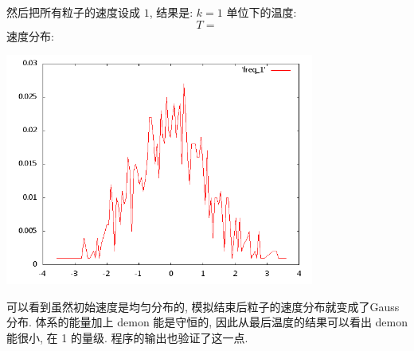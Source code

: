 \documentclass{ctexart}
\begin{document}
然后把所有粒子的速度设成 $1$, 结果是:
$k=1$ 单位下的温度:
\[
T = 
\]
速度分布:
\begin{center}
\includegraphics[width=4in]{freq_1.png}
\end{center}

可以看到虽然初始速度是均匀分布的, 模拟结束后粒子的速度分布就变成了Gauss分布.
体系的能量加上 demon 能是守恒的, 因此从最后温度的结果可以看出 demon 能很小,
在 1 的量级. 程序的输出也验证了这一点.
\end{document}
